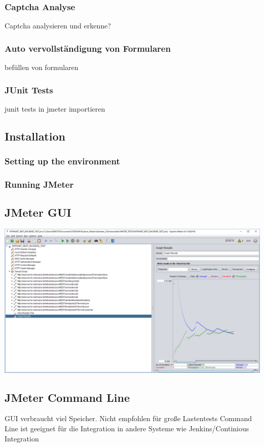 \documentclass[a4paper,12pt]{article}
\begin{document}
\subsubsection{Captcha Analyse}
Captcha analysieren und erkenne?

\subsubsection{Auto vervollständigung von Formularen}
befüllen von formularen

\subsubsection{JUnit Tests}
junit tests in jmeter importieren
\subsection{Installation}
\subsubsection{Setting up the environment}
\subsubsection{Running JMeter}

\subsection{JMeter GUI}
\includegraphics[width=1\textwidth]{bilder/jmeter_2.png}\par\vspace{1cm}

\subsection{JMeter Command Line}
GUI verbraucht viel Speicher. Nicht empfohlen für große Lastentests
Command Line ist geeignet für die Integration in andere Systeme wie Jenkins/Continious Integration
\end{document}

